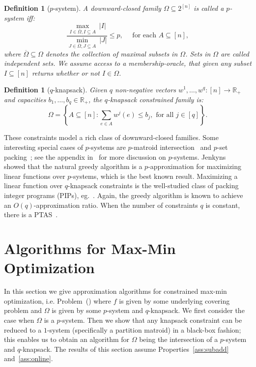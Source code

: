 \documentclass[11pt,letterpaper]{article}
\newtheorem{definition}[theorem]{Definition}
\newcommand{\sse}{\subseteq}
\newcommand{\I}{{\Omega}}
\newcounter{note}[section]
\begin{document}
\begin{definition}[$p$-system]\label{defn:p-system} A downward-closed family $\Omega\sse 2^{[n]}$ is called a $p$-system iff:
$$ \frac{\max_{I\in \overline{\Omega}, I\sse A}~|I|}{\min_{J\in \overline{\Omega}, J\sse A}~|J|} \le p,\quad
\mbox{ for each }A\sse[n],$$ where $\overline{\Omega}\sse \Omega$ denotes the collection of {\em maximal subsets} in
$\Omega$. Sets in $\Omega$ are called {\em independent sets}. We assume access to a membership-oracle, that given any
subset $I\sse[n]$ returns whether or not $I\in \Omega$.
\end{definition}

\begin{definition}[$q$-knapsack]\label{defn:q-knapsack}
Given $q$ non-negative vectors $w^1,\ldots,w^q: [n]\rightarrow \mathbb{R}_+$ and capacities $b_1,\ldots,b_q\in
\mathbb{R}_+$, the $q$-knapsack constrained family is:
$$\Omega = \left\{ A\sse [n] : \sum_{e\in A} w^j(e)\le b_j, \mbox{ for all }j\in[q]\right\}.$$
\end{definition}

These constraints model a rich class of downward-closed families. Some interesting special cases of $p$-systems are
$p$-matroid intersection~\cite{Schr-book} and $p$-set packing~\cite{HS89,B00}; see the appendix in~\cite{CCPV07} for
more discussion on $p$-systems. Jenkyns~\cite{J76} showed that the natural greedy algorithm is a $p$-approximation for
maximizing linear functions over $p$-systems, which is the best known result. Maximizing a linear function over
$q$-knapsack constraints is the well-studied class of packing integer programs (PIPs), eg.~\cite{S99}. Again, the
greedy algorithm is known to achieve an $O(q)$-approximation ratio. When the number of constraints $q$ is constant,
there is a PTAS~\cite{CK04-multidim}.




\section{Algorithms for Max-Min Optimization}
\label{sec:max-min}

In this section we give approximation algorithms for constrained max-min optimization, i.e. Problem~(\maxf) where $f$
is given by some underlying covering problem and $\I$ is given by some $p$-system and $q$-knapsack. We first consider
the case when $\I$ is a  $p$-system. Then we show that any knapsack constraint can be reduced to a $1$-system
(specifically a partition matroid) in a black-box fashion; this enables us to obtain an algorithm for $\I$ being the
intersection of a  $p$-system and $q$-knapsack. The results of this section assume Properties~\ref{ass:subadd}
and~\ref{ass:online}.
\end{document}
